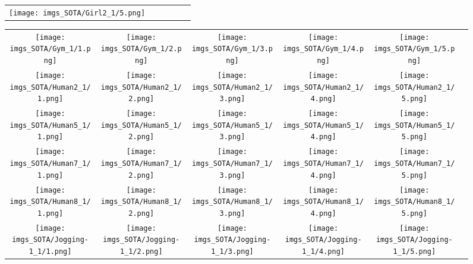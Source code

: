 \begin{figure}[H]
\begin{tabular}{@{}c@{}c@{}c@{}c@{}c@{}c@{}}
\texttt{[image: imgs\_SOTA/Girl2\_1/5.png]}&
\\
\end{tabular}\end{figure}\begin{figure}[H]
\setlength{\tabcolsep}{6pt}
\renewcommand{\arraystretch}{0}
\begin{tabular}{@{}c@{}c@{}c@{}c@{}c@{}c@{}}\texttt{[image: imgs\_SOTA/Gym\_1/1.png]}&
\texttt{[image: imgs\_SOTA/Gym\_1/2.png]}&
\texttt{[image: imgs\_SOTA/Gym\_1/3.png]}&
\texttt{[image: imgs\_SOTA/Gym\_1/4.png]}&
\texttt{[image: imgs\_SOTA/Gym\_1/5.png]}&
\\
\texttt{[image: imgs\_SOTA/Human2\_1/1.png]}&
\texttt{[image: imgs\_SOTA/Human2\_1/2.png]}&
\texttt{[image: imgs\_SOTA/Human2\_1/3.png]}&
\texttt{[image: imgs\_SOTA/Human2\_1/4.png]}&
\texttt{[image: imgs\_SOTA/Human2\_1/5.png]}&
\\
\texttt{[image: imgs\_SOTA/Human5\_1/1.png]}&
\texttt{[image: imgs\_SOTA/Human5\_1/2.png]}&
\texttt{[image: imgs\_SOTA/Human5\_1/3.png]}&
\texttt{[image: imgs\_SOTA/Human5\_1/4.png]}&
\texttt{[image: imgs\_SOTA/Human5\_1/5.png]}&
\\
\texttt{[image: imgs\_SOTA/Human7\_1/1.png]}&
\texttt{[image: imgs\_SOTA/Human7\_1/2.png]}&
\texttt{[image: imgs\_SOTA/Human7\_1/3.png]}&
\texttt{[image: imgs\_SOTA/Human7\_1/4.png]}&
\texttt{[image: imgs\_SOTA/Human7\_1/5.png]}&
\\
\texttt{[image: imgs\_SOTA/Human8\_1/1.png]}&
\texttt{[image: imgs\_SOTA/Human8\_1/2.png]}&
\texttt{[image: imgs\_SOTA/Human8\_1/3.png]}&
\texttt{[image: imgs\_SOTA/Human8\_1/4.png]}&
\texttt{[image: imgs\_SOTA/Human8\_1/5.png]}&
\\
\texttt{[image: imgs\_SOTA/Jogging-1\_1/1.png]}&
\texttt{[image: imgs\_SOTA/Jogging-1\_1/2.png]}&
\texttt{[image: imgs\_SOTA/Jogging-1\_1/3.png]}&
\texttt{[image: imgs\_SOTA/Jogging-1\_1/4.png]}&
\texttt{[image: imgs\_SOTA/Jogging-1\_1/5.png]}&
\\

\end{tabular}
\end{figure}
